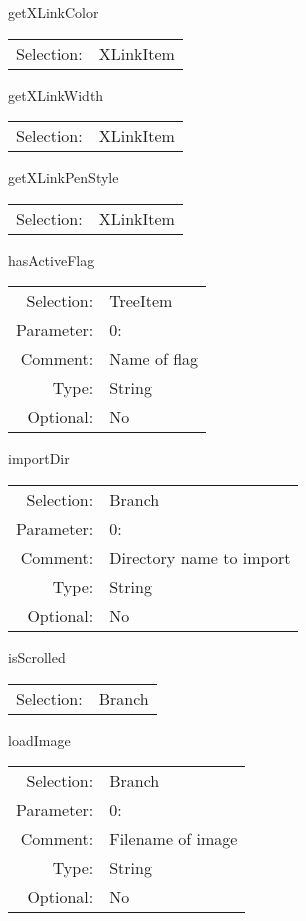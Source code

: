 \item getXLinkColor\\
\begin{tabular}{rl}
  Selection: & XLinkItem\\
\end{tabular}

\item getXLinkWidth\\
\begin{tabular}{rl}
  Selection: & XLinkItem\\
\end{tabular}

\item getXLinkPenStyle\\
\begin{tabular}{rl}
  Selection: & XLinkItem\\
\end{tabular}

\item hasActiveFlag\\
\begin{tabular}{rl}
  Selection: & TreeItem\\
   Parameter: &  0:\\
        Comment: & Name of flag\\
           Type: & String\\
       Optional: &  No\\
\end{tabular}

\item importDir\\
\begin{tabular}{rl}
  Selection: & Branch\\
   Parameter: &  0:\\
        Comment: & Directory name to import\\
           Type: & String\\
       Optional: &  No\\
\end{tabular}

\item isScrolled\\
\begin{tabular}{rl}
  Selection: & Branch\\
\end{tabular}

\item loadImage\\
\begin{tabular}{rl}
  Selection: & Branch\\
   Parameter: &  0:\\
        Comment: & Filename of image\\
           Type: & String\\
       Optional: &  No\\
\end{tabular}

